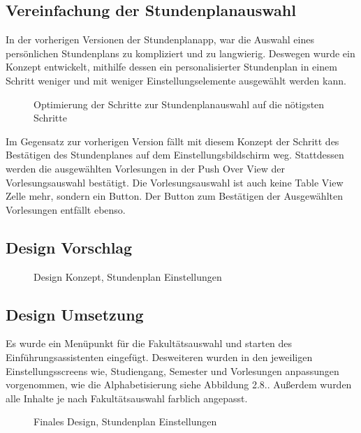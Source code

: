 \subsection{Vereinfachung der Stundenplanauswahl}
In der vorherigen Versionen der Stundenplanapp, war die Auswahl eines persönlichen Stundenplans zu kompliziert und zu langwierig. Deswegen wurde ein Konzept entwickelt, mithilfe dessen ein personalisierter Stundenplan in einem Schritt weniger und mit weniger Einstellungselemente  ausgewählt werden kann.

\begin{figure}[H]
	\centering
	\caption{Optimierung der Schritte zur Stundenplanauswahl auf die nötigsten Schritte}
	\label{fig1}
\end{figure}

Im Gegensatz zur vorherigen Version fällt mit diesem Konzept der Schritt des Bestätigen des Stundenplanes auf dem Einstellungsbildschirm weg. Stattdessen werden die ausgewählten Vorlesungen in der Push Over View der Vorlesungsauswahl bestätigt. Die Vorlesungsauswahl ist auch keine Table View Zelle mehr, sondern ein Button. Der Button zum Bestätigen der Ausgewählten Vorlesungen entfällt ebenso.

\subsection{Design Vorschlag}

\begin{figure}[H]
	\centering
	\caption{Design Konzept, Stundenplan Einstellungen}
	\label{fig1}
\end{figure}

\subsection{Design Umsetzung}
Es wurde ein Menüpunkt für die Fakultätsauswahl und starten des Einführungsassistenten eingefügt. Desweiteren wurden in den jeweiligen Einstellungsscreens wie, Studiengang, Semester und Vorlesungen anpassungen vorgenommen, wie die Alphabetisierung siehe Abbildung 2.8.. Außerdem wurden alle Inhalte je nach Fakultätsauswahl farblich angepasst.

\begin{figure}[H]
	\centering
	\caption{Finales Design, Stundenplan Einstellungen}
	\label{fig1}
\end{figure}

